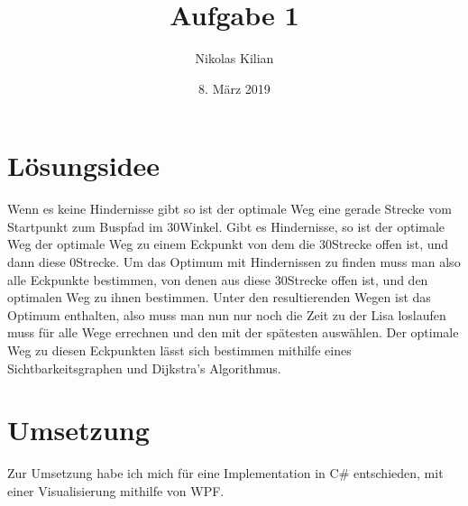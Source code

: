 \documentclass[12pt]{article}
\title{\vspace{-2.0cm}Aufgabe 1}
\author{Nikolas Kilian}
\date{8. März 2019}
\begin{document}
\maketitle

\section{Lösungsidee}
Wenn es keine Hindernisse gibt so ist der optimale Weg eine gerade Strecke vom Startpunkt zum Buspfad im 30\degree Winkel.
Gibt es Hindernisse, so ist der optimale Weg der optimale Weg zu einem Eckpunkt von dem die 30\degree Strecke offen ist, und dann diese 0\degree Strecke.
Um das Optimum mit Hindernissen zu finden muss man also alle Eckpunkte bestimmen, von denen aus diese 30\degree Strecke offen ist, und den optimalen Weg zu ihnen bestimmen. Unter den resultierenden Wegen ist das Optimum enthalten, also muss man nun nur noch die Zeit zu der Lisa loslaufen muss für alle Wege errechnen und den mit der spätesten auswählen.
Der optimale Weg zu diesen Eckpunkten lässt sich bestimmen mithilfe eines Sichtbarkeitsgraphen und Dijkstra's Algorithmus.

\section{Umsetzung}
Zur Umsetzung habe ich mich für eine Implementation in C\# entschieden, mit einer Visualisierung mithilfe von WPF.
\end{document}
